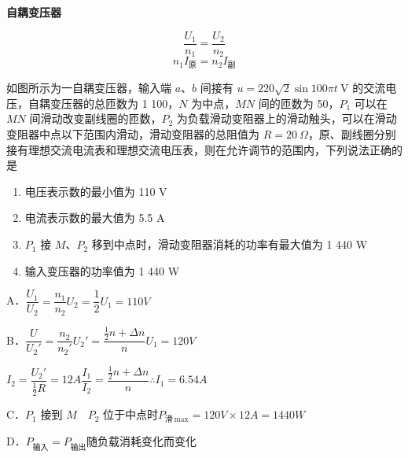 \textbf{自耦变压器}

\[
\frac{U_1}{n_1}=\frac{U_2}{n_2}
\]
\[
n_1I_{\text{原}}=n_2I_{\text{副}}
\]

\begin{problem}
如图所示为一自耦变压器，输入端 $a$、$b$ 间接有 $u=220\sqrt{2}\sin 100\pi t\ \mathrm{V}$ 的交流电压，自耦变压器的总匝数为 1 100，$N$ 为中点，$MN$ 间的匝数为 50，$P_1$ 可以在 $MN$ 间滑动改变副线圈的匝数，$P_2$ 为负载滑动变阻器上的滑动触头，可以在滑动变阻器中点以下范围内滑动，滑动变阻器的总阻值为 $R=20\ \Omega$，原、副线圈分别接有理想交流电流表和理想交流电压表，则在允许调节的范围内，下列说法正确的是
\begin{enumerate}[label=\Alph*.,leftmargin=2em,itemsep=0pt]
\item 电压表示数的最小值为 110 V %
\item 电流表示数的最大值为 5.5 A
\item $P_1$ 接 $M$、$P_2$ 移到中点时，滑动变阻器消耗的功率有最大值为 1 440 W
\item 输入变压器的功率值为 1 440 W %
\end{enumerate}
\begin{solution}
A．$\dfrac{U_1}{U_2}=\dfrac{n_1}{n_2}$\qquad $U_2=\dfrac{1}{2}U_1=110\unit{V}$

B．$\dfrac{U}{U_2'}=\dfrac{n_2}{n_2'}$\qquad $U_2'=\dfrac{\frac{1}{2}n+\Delta n}{n}U_1=120\unit{V}$

$I_2=\dfrac{U_2'}{\frac{1}{2}R}=12\unit{A}$\qquad $\dfrac{I_1}{I_2}=\dfrac{\frac{1}{2}n+\Delta n}{n}$\qquad $\therefore I_1=6.54\unit{A}$

C．$P_1$ 接到 $M$　$P_2$ 位于中点时\quad $P_{\text{滑}\,\mathrm{max}}=120\unit{V}\times12\unit{A}=1440\unit{W}$

D．$P_{\text{输入}}=P_{\text{输出}}$\quad 随负载消耗变化而变化

\end{solution}
\end{problem}

